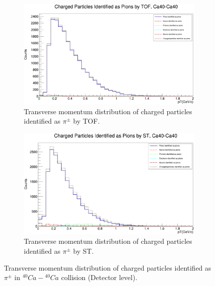 \documentclass[12pt, twocolumn]{article}
\begin{document}
\begin{figure}[h]
\centering
\begin{subfigure}[h]{0.49\textwidth}
\centering
\includegraphics[scale=0.14]{Detector_pT_pions(tof)_Ca.png}
\caption{Transverse momentum distribution of charged particles identified as $\pi^{\pm}$ by TOF.}
\label{Detector - Transverse momentum distribution of pions (TOF) Ca40.}
\end{subfigure}
\hfill
\begin{subfigure}[h]{0.49\textwidth}
\centering
\includegraphics[scale=0.14]{Detector_pT_pions(st)_Ca.png}
\caption{Transverse momentum distribution of charged particles identified as $\pi^{\pm}$ by ST.}
\label{Detector - Transverse momentum distribution of pions (ST) Ca40.}
\end{subfigure}
\caption{Transverse momentum distribution of charged particles identified as $\pi^{\pm}$ in $^{40}Ca-{^{40}Ca}$ collision (Detector level).}
\label{Transverse momentum distribution of charged particles identified as pions in Ca40-Ca40 collision.}
\end{figure}
\end{document}
